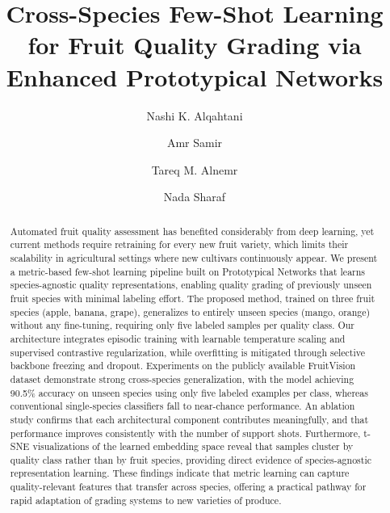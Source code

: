 \documentclass[preprint,12pt,authoryear]{elsarticle}
\begin{document}
\begin{frontmatter}

\title{Cross-Species Few-Shot Learning for Fruit Quality Grading via Enhanced
  Prototypical Networks}

\author[inst1,inst2]{Nashi K. Alqahtani}

\author[inst3]{Amr Samir}

\author[inst2]{Tareq M. Alnemr}

\author[inst3]{Nada Sharaf}


\address[inst1]{Date Palm Research Center of Excellence, King Faisal University,
  P.O.\ Box 400, Al-Ahsa 31982, Saudi Arabia}

\address[inst2]{Department of Food and Nutrition Sciences, College of Agricultural
  and Food Sciences, King Faisal University, Al-Ahsa 31982, Saudi Arabia}

\address[inst3]{Department of Informatics and Computer Science, The German
  International University, New Capital Administrative City, Cairo, Egypt}

\begin{abstract}
Automated fruit quality assessment has benefited considerably from deep learning,
yet current methods require retraining for every new fruit variety, which limits
their scalability in agricultural settings where new cultivars continuously appear.
We present a metric-based few-shot learning pipeline built on Prototypical Networks
that learns species-agnostic quality representations, enabling quality grading of
previously unseen fruit species with minimal labeling effort. The proposed method,
trained on three fruit species (apple, banana, grape), generalizes to entirely
unseen species (mango, orange) without any fine-tuning, requiring only five labeled
samples per quality class. Our architecture integrates episodic training with
learnable temperature scaling and supervised contrastive regularization, while
overfitting is mitigated through selective backbone freezing and dropout.
Experiments on the publicly available FruitVision dataset demonstrate strong
cross-species generalization, with the model achieving 90.5\% accuracy on unseen
species using only five labeled examples per class, whereas conventional
single-species classifiers fall to near-chance performance. An ablation study
confirms that each architectural component contributes meaningfully, and that
performance improves consistently with the number of support shots. Furthermore,
t-SNE visualizations of the learned embedding space reveal that samples cluster by
quality class rather than by fruit species, providing direct evidence of
species-agnostic representation learning. These findings indicate that metric
learning can capture quality-relevant features that transfer across species,
offering a practical pathway for rapid adaptation of grading systems to new
varieties of produce.
\end{abstract}


\end{frontmatter}
\end{document}
